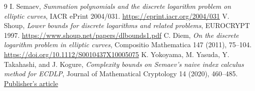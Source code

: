 \documentclass[11pt]{article}
\begin{document}
\begin{thebibliography}{9}
I. Semaev, \emph{Summation polynomials and the discrete logarithm problem on elliptic curves}, IACR ePrint 2004/031. \url{https://eprint.iacr.org/2004/031}
V. Shoup, \emph{Lower bounds for discrete logarithms and related problems}, EUROCRYPT 1997. \url{https://www.shoup.net/papers/dlbounds1.pdf}
C. Diem, \emph{On the discrete logarithm problem in elliptic curves}, Compositio Mathematica 147 (2011), 75--104. \url{https://doi.org/10.1112/S0010437X10005075}
K. Yokoyama, M. Yasuda, Y. Takahashi, and J. Kogure, \emph{Complexity bounds on Semaev's naive index calculus method for ECDLP}, Journal of Mathematical Cryptology 14 (2020), 460--485. \href{https://www.degruyterbrill.com/document/doi/10.1515/jmc-2019-0029/html}{Publisher's article}
\end{thebibliography}
\end{document}
